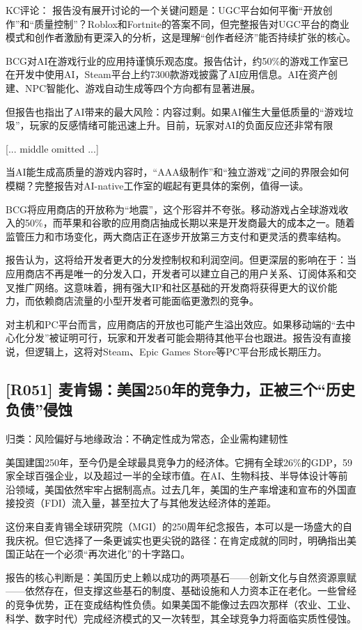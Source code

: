 \documentclass[11pt]{ctexart}
\begin{document}
KC评论： 报告没有展开讨论的一个关键问题是：UGC平台如何平衡“开放创作”和“质量控制”？Roblox和Fortnite的答案不同，但完整报告对UGC平台的商业模式和创作者激励有更深入的分析，这是理解“创作者经济”能否持续扩张的核心。

BCG对AI在游戏行业的应用持谨慎乐观态度。报告估计，约50\%的游戏工作室已在开发中使用AI，Steam平台上约7300款游戏披露了AI应用信息。AI在资产创建、NPC智能化、游戏自动生成等四个方向都有显著进展。

但报告也指出了AI带来的最大风险：内容过剩。如果AI催生大量低质量的“游戏垃圾”，玩家的反感情绪可能迅速上升。目前，玩家对AI的负面反应还非常有限

[... middle omitted ...]

当AI能生成高质量的游戏内容时，“AAA级制作”和“独立游戏”之间的界限会如何模糊？完整报告对AI-native工作室的崛起有更具体的案例，值得一读。

BCG将应用商店的开放称为“地震”，这个形容并不夸张。移动游戏占全球游戏收入的50\%，而苹果和谷歌的应用商店抽成长期以来是开发商最大的成本之一。随着监管压力和市场变化，两大商店正在逐步开放第三方支付和更灵活的费率结构。

报告认为，这将给开发者更大的分发控制权和利润空间。但更深层的影响在于：当应用商店不再是唯一的分发入口，开发者可以建立自己的用户关系、订阅体系和交叉推广网络。这意味着，拥有强大IP和社区基础的开发商将获得更大的议价能力，而依赖商店流量的小型开发者可能面临更激烈的竞争。

对主机和PC平台而言，应用商店的开放也可能产生溢出效应。如果移动端的“去中心化分发”被证明可行，玩家和开发者可能会期待其他平台也跟进。报告没有直接说，但逻辑上，这将对Steam、Epic Games Store等PC平台形成长期压力。

\subsection{[R051] 麦肯锡：美国250年的竞争力，正被三个“历史负债”侵蚀}
{\small\color{refgray}归类：风险偏好与地缘政治：不确定性成为常态，企业需构建韧性}

美国建国250年，至今仍是全球最具竞争力的经济体。它拥有全球26\%的GDP，59家全球百强企业，以及超过一半的全球市值。在AI、生物科技、半导体设计等前沿领域，美国依然牢牢占据制高点。过去几年，美国的生产率增速和宣布的外国直接投资（FDI）流入量，甚至拉大了与其他发达经济体的差距。

这份来自麦肯锡全球研究院（MGI）的250周年纪念报告，本可以是一场盛大的自我庆祝。但它选择了一条更诚实也更尖锐的路径：在肯定成就的同时，明确指出美国正站在一个必须“再次进化”的十字路口。

报告的核心判断是：美国历史上赖以成功的两项基石——创新文化与自然资源禀赋——依然存在，但支撑这些基石的制度、基础设施和人力资本正在老化。一些曾经的竞争优势，正在变成结构性负债。如果美国不能像过去四次那样（农业、工业、科学、数字时代）完成经济模式的又一次转型，其全球竞争力将面临实质性侵蚀。
\end{document}
